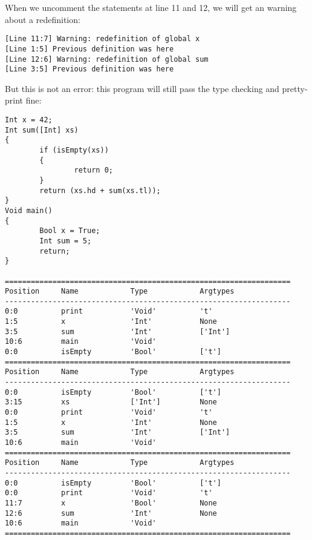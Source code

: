 \documentclass[a4paper]{article}
\begin{document}
When we uncomment the statements at line 11 and 12, we will get an warning about a redefinition:
\begin{verbatim}
[Line 11:7] Warning: redefinition of global x
[Line 1:5] Previous definition was here
[Line 12:6] Warning: redefinition of global sum
[Line 3:5] Previous definition was here
\end{verbatim}

But this is not an error: this program will still pass the type checking and pretty-print fine: 
\begin{verbatim}
Int x = 42;
Int sum([Int] xs)
{
        if (isEmpty(xs))
        {
                return 0;
        }
        return (xs.hd + sum(xs.tl));
}
Void main()
{
        Bool x = True;
        Int sum = 5;
        return;
}

==================================================================
Position     Name            Type            Argtypes            
------------------------------------------------------------------
0:0          print           'Void'          't'                 
1:5          x               'Int'           None                
3:5          sum             'Int'           ['Int']             
10:6         main            'Void'                              
0:0          isEmpty         'Bool'          ['t']               
==================================================================
Position     Name            Type            Argtypes            
------------------------------------------------------------------
0:0          isEmpty         'Bool'          ['t']               
3:15         xs              ['Int']         None                
0:0          print           'Void'          't'                 
1:5          x               'Int'           None                
3:5          sum             'Int'           ['Int']             
10:6         main            'Void'                              
==================================================================
Position     Name            Type            Argtypes            
------------------------------------------------------------------
0:0          isEmpty         'Bool'          ['t']               
0:0          print           'Void'          't'                 
11:7         x               'Bool'          None                
12:6         sum             'Int'           None                
10:6         main            'Void'                              
==================================================================
\end{verbatim}
\end{document}
